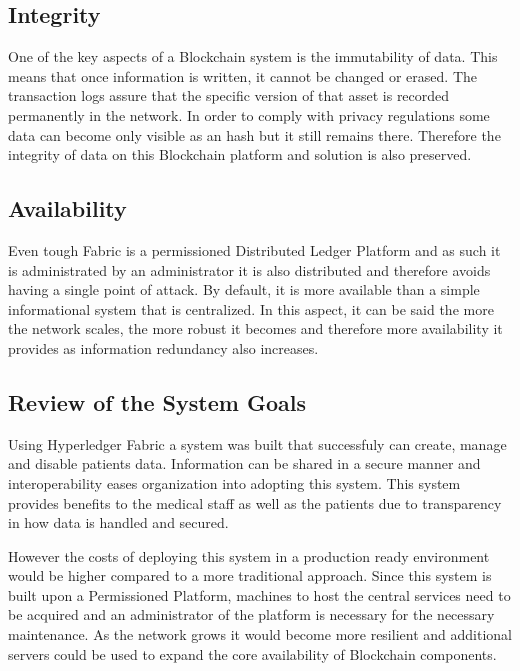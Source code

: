 \subsection{Integrity}

One of the key aspects of a Blockchain system is the immutability of data. This
means that once information is written, it cannot be changed or erased. The
transaction logs assure that the specific version of that asset is recorded
permanently in the network. In order to comply with privacy regulations some
data can become only visible as an hash but it still remains there. Therefore
the integrity of data on this Blockchain platform and solution is also
preserved.

\subsection{Availability}

Even tough Fabric is a permissioned Distributed Ledger Platform and as such it
is administrated by an administrator it is also distributed and therefore
avoids having a single point of attack. By default, it is more available than a
simple informational system that is centralized. In this aspect, it can be said
the more the network scales, the more robust it becomes and therefore more
availability it provides as information redundancy also increases.

\subsection{Review of the System Goals}

Using Hyperledger Fabric a system was built that successfuly can create, manage
and disable patients data. Information can be shared in a secure manner and
interoperability eases organization into adopting this system. This system
provides benefits to the medical staff as well as the patients due to
transparency in how data is handled and secured.

However the costs of deploying this system in a production ready environment
would be higher compared to a more traditional approach. Since this system is
built upon a Permissioned Platform, machines to host the central services need
to be acquired and an administrator of the platform is necessary for the
necessary maintenance. As the network grows it would become more resilient and
additional servers could be used to expand the core availability of Blockchain
components.

